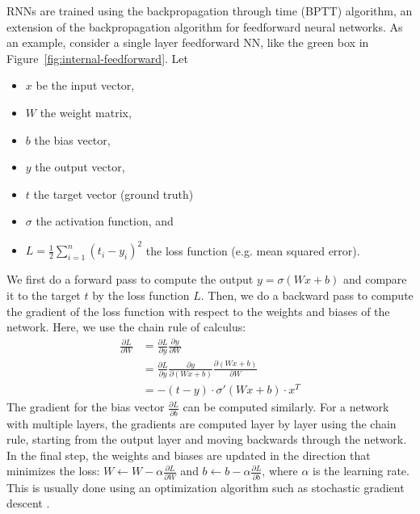 \documentclass{article}
\newcommand{\reffig}[1]{Figure~\ref{#1}}
\begin{document}
RNNs are trained using the backpropagation through time (BPTT) algorithm, an
extension of the backpropagation algorithm for feedforward neural networks. As an example,
consider a single layer feedforward NN, like the green box in
\reffig{fig:internal-feedforward}. Let
\begin{itemize}
  \item $x$ be the input vector,
  \item $W$ the weight matrix,
  \item $b$ the bias vector,
  \item $y$ the output vector,
  \item $t$ the target vector (ground truth)
  \item $\sigma$ the activation function, and
  \item $L = \frac{1}{2} \sum_{i=1}^{n} (t_i - y_i)^2$ the loss function (e.g. mean
        squared error).
\end{itemize}
We first do a forward pass to compute the output $y = \sigma(Wx + b)$ and compare it to
the target $t$ by the loss function $L$. Then, we do a backward pass to compute the
gradient of the loss function with respect to the weights and biases of the network. Here,
we use the chain rule of calculus:
\begin{align}
  \frac{\partial L}{\partial W} & = \frac{\partial L}{\partial y} \frac{\partial y}{\partial W}                                             \\
                                & = \frac{\partial L}{\partial y} \frac{\partial y}{\partial (Wx + b)} \frac{\partial (Wx + b)}{\partial W} \\
                                & = -(t-y) \cdot \sigma'(Wx + b) \cdot x^T
\end{align}
The gradient for the bias vector $\frac{\partial L}{\partial b}$ can be computed
similarly. For a network with multiple layers, the gradients are computed layer by layer
using the chain rule, starting from the output layer and moving backwards through the
network. In the final step, the weights and biases are updated in the direction that
minimizes the loss: $W \leftarrow W - \alpha \frac{\partial L}{\partial W}$ and $b
  \leftarrow b - \alpha \frac{\partial L}{\partial b}$, where $\alpha$ is the learning rate.
This is usually done using an optimization algorithm such as stochastic gradient descent
\cite{Goodfellow2016}.
\end{document}
